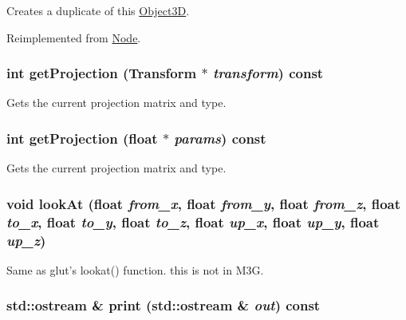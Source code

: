 Creates a duplicate of this \hyperlink{classm3g_1_1Object3D}{Object3D}. 

Reimplemented from \hyperlink{classm3g_1_1Node_0b9f7531a4b56d34f47aeb1fff0d37e0}{Node}.\hypertarget{classm3g_1_1Camera_9e0c204df146342990703acb744954b1}{
\subsubsection[{getProjection}]{\setlength{\rightskip}{0pt plus 5cm}int getProjection ({\bf Transform} $\ast$ {\em transform}) const}}
\label{classm3g_1_1Camera_9e0c204df146342990703acb744954b1}


Gets the current projection matrix and type. \hypertarget{classm3g_1_1Camera_a2ebe46a4e16fee86d4f547588411302}{
\subsubsection[{getProjection}]{\setlength{\rightskip}{0pt plus 5cm}int getProjection (float $\ast$ {\em params}) const}}
\label{classm3g_1_1Camera_a2ebe46a4e16fee86d4f547588411302}


Gets the current projection matrix and type. \hypertarget{classm3g_1_1Camera_0006b18ae0e27a031d533e987b9756a8}{
\subsubsection[{lookAt}]{\setlength{\rightskip}{0pt plus 5cm}void lookAt (float {\em from\_\-x}, \/  float {\em from\_\-y}, \/  float {\em from\_\-z}, \/  float {\em to\_\-x}, \/  float {\em to\_\-y}, \/  float {\em to\_\-z}, \/  float {\em up\_\-x}, \/  float {\em up\_\-y}, \/  float {\em up\_\-z})}}
\label{classm3g_1_1Camera_0006b18ae0e27a031d533e987b9756a8}


Same as glut's lookat() function. this is not in M3G. \hypertarget{classm3g_1_1Camera_6fea17fa1532df3794f8cb39cb4f911f}{
\subsubsection[{print}]{\setlength{\rightskip}{0pt plus 5cm}std::ostream \& print (std::ostream \& {\em out}) const}}
\label{classm3g_1_1Camera_6fea17fa1532df3794f8cb39cb4f911f}


